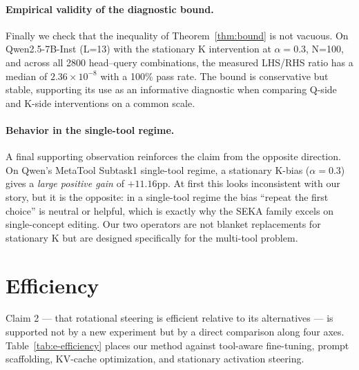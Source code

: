 \paragraph{Empirical validity of the diagnostic bound.}
Finally we check that the inequality of Theorem~\ref{thm:bound} is not vacuous. On Qwen2.5-7B-Inst (L=13) with the stationary K intervention at $\alpha=0.3$, N=100, and across all 2800 head--query combinations, the measured LHS/RHS ratio has a median of $2.36\times 10^{-8}$ with a 100\% pass rate. The bound is conservative but stable, supporting its use as an informative diagnostic when comparing Q-side and K-side interventions on a common scale.

\paragraph{Behavior in the single-tool regime.}
A final supporting observation reinforces the claim from the opposite direction. On Qwen's MetaTool Subtask1 single-tool regime, a stationary K-bias ($\alpha=0.3$) gives a \emph{large positive gain} of $+11.16$pp. At first this looks inconsistent with our story, but it is the opposite: in a single-tool regime the bias ``repeat the first choice'' is neutral or helpful, which is exactly why the SEKA family excels on single-concept editing. Our two operators are not blanket replacements for stationary K but are designed specifically for the multi-tool problem.

\section{Efficiency}\label{sec:exp:efficiency}

Claim 2 --- that rotational steering is efficient relative to its alternatives --- is supported not by a new experiment but by a direct comparison along four axes. Table~\ref{tab:e-efficiency} places our method against tool-aware fine-tuning, prompt scaffolding, KV-cache optimization, and stationary activation steering.

